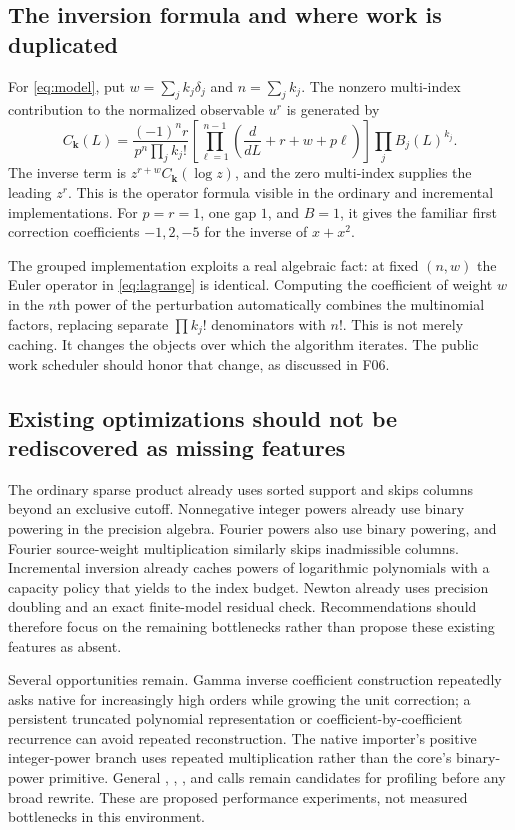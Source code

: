 \documentclass[11pt,letterpaper]{article}
\newcommand{\code}[1]{\texttt{\small\detokenize{#1}}}
\begin{document}
\subsection{The inversion formula and where work is duplicated}
For \eqref{eq:model}, put $w=\sum_j k_j\delta_j$ and $n=\sum_j k_j$. The nonzero multi-index contribution to the normalized observable $u^r$ is generated by
\begin{equation}
 C_{\boldsymbol k}(L)=
 \frac{(-1)^n r}{p^n\prod_j k_j!}
 \left[\prod_{\ell=1}^{n-1}
    \left(\frac{d}{dL}+r+w+p\ell\right)\right]
 \prod_j B_j(L)^{k_j}.
 \label{eq:lagrange}
\end{equation}
The inverse term is $z^{r+w}C_{\boldsymbol k}(\log z)$, and the zero multi-index supplies the leading $z^r$. This is the operator formula visible in the ordinary and incremental implementations. For $p=r=1$, one gap $1$, and $B=1$, it gives the familiar first correction coefficients $-1,2,-5$ for the inverse of $x+x^2$.\cite{repo-core,repo-incremental}

The grouped implementation exploits a real algebraic fact: at fixed $(n,w)$ the Euler operator in \eqref{eq:lagrange} is identical. Computing the coefficient of weight $w$ in the $n$th power of the perturbation automatically combines the multinomial factors, replacing separate $\prod k_j!$ denominators with $n!$. This is not merely caching. It changes the objects over which the algorithm iterates. The public work scheduler should honor that change, as discussed in F06.

\subsection{Existing optimizations should not be rediscovered as missing features}
The ordinary sparse product already uses sorted support and skips columns beyond an exclusive cutoff. Nonnegative integer powers already use binary powering in the precision algebra. Fourier powers also use binary powering, and Fourier source-weight multiplication similarly skips inadmissible columns. Incremental inversion already caches powers of logarithmic polynomials with a capacity policy that yields to the index budget. Newton already uses precision doubling and an exact finite-model residual check. Recommendations should therefore focus on the remaining bottlenecks rather than propose these existing features as absent.\cite{repo-core,repo-fourier,repo-incremental}

Several opportunities remain. Gamma inverse coefficient construction repeatedly asks native \code{Series} for increasingly high orders while growing the unit correction; a persistent truncated polynomial representation or coefficient-by-coefficient recurrence can avoid repeated reconstruction. The native importer's positive integer-power branch uses repeated multiplication rather than the core's binary-power primitive. General \code{Expand}, \code{Together}, \code{Simplify}, and \code{FullSimplify} calls remain candidates for profiling before any broad rewrite. These are proposed performance experiments, not measured bottlenecks in this environment.\cite{repo-gamma,repo-native,repo-core}
\end{document}
